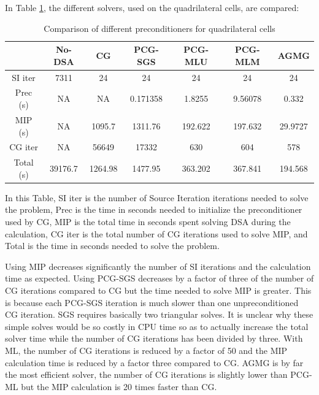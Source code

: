 In Table \ref{tab_1}, the different solvers, used on the quadrilateral cells, 
are compared:
\begin{table}[H]
\begin{center}
\caption{Comparison of different preconditioners for quadrilateral cells}
\begin{tabular}{|c|c|c|c|c|c|c|}
\hline
& No-DSA & CG & PCG-SGS &  PCG-MLU & PCG-MLM & AGMG\\
\hline
SI iter   & 7311    & 24      & 24       & 24      & 24      & 24      \\
Prec (s)  & NA      & NA      & 0.171358 & 1.8255  & 9.56078 & 0.332   \\
MIP (s)   & NA      & 1095.7  & 1311.76  & 192.622 & 197.632 & 29.9727 \\
CG iter   & NA      & 56649   & 17332    & 630     & 604     & 578     \\
Total (s) & 39176.7 & 1264.98 & 1477.95  & 363.202 & 367.841 & 194.568 \\
\hline
\end{tabular}
\label{tab_1}
\end{center}
\end{table}
In this Table, SI iter is the number of Source Iteration iterations 
needed to solve the problem, Prec is the time in seconds needed to
initialize the preconditioner used by CG, MIP is the total time in
seconds spent solving DSA during the calculation, CG iter is the total number 
of CG iterations used to solve MIP, and Total is the time in
seconds needed to solve the problem.

Using MIP decreases significantly the number of SI iterations and the
calculation time as expected. Using PCG-SGS decreases by a factor of three 
of the number of CG iterations compared to CG but the time needed to solve 
MIP is greater. This is because each PCG-SGS iteration is much slower
  than one unpreconditioned CG iteration. SGS requires basically two
  triangular solves. It is unclear why these simple solves would be so costly
  in CPU time so as to actually increase the total solver time while the
 number of CG iterations has been divided by three. With ML, the number 
of CG iterations is reduced by a factor 
of 50 and the MIP calculation time is reduced by a factor three compared to 
CG. AGMG is by far the most efficient solver, the number of CG iterations is 
slightly lower than PCG-ML but the MIP calculation is 20 times faster than CG.

